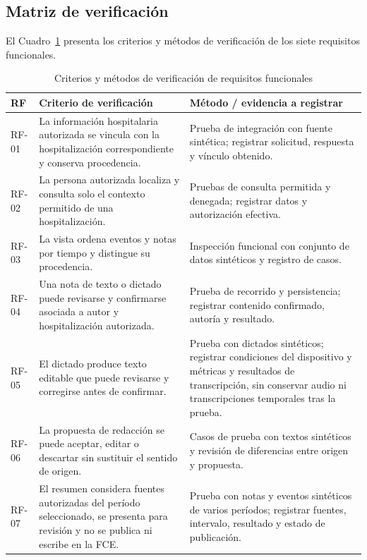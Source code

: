 \subsection{Matriz de verificación}

El Cuadro~\ref{tab:verificacion_rf} presenta los criterios y métodos de verificación de los siete requisitos funcionales.

\begin{table}[H]
    \caption{Criterios y métodos de verificación de requisitos funcionales}
    \label{tab:verificacion_rf}
    \begin{tabularx}{\textwidth}{|l|X|X|}
        \hline
        \textbf{RF} & \textbf{Criterio de verificación} & \textbf{Método / evidencia a registrar} \\
        \hline
        RF-01 & La información hospitalaria autorizada se vincula con la hospitalización correspondiente y conserva procedencia. & Prueba de integración con fuente sintética; registrar solicitud, respuesta y vínculo obtenido. \\
        \hline
        RF-02 & La persona autorizada localiza y consulta solo el contexto permitido de una hospitalización. & Pruebas de consulta permitida y denegada; registrar datos y autorización efectiva. \\
        \hline
        RF-03 & La vista ordena eventos y notas por tiempo y distingue su procedencia. & Inspección funcional con conjunto de datos sintéticos y registro de casos. \\
        \hline
        RF-04 & Una nota de texto o dictado puede revisarse y confirmarse asociada a autor y hospitalización autorizada. & Prueba de recorrido y persistencia; registrar contenido confirmado, autoría y resultado. \\
        \hline
        RF-05 & El dictado produce texto editable que puede revisarse y corregirse antes de confirmar. & Prueba con dictados sintéticos; registrar condiciones del dispositivo y métricas y resultados de transcripción, sin conservar audio ni transcripciones temporales tras la prueba. \\
        \hline
        RF-06 & La propuesta de redacción se puede aceptar, editar o descartar sin sustituir el sentido de origen. & Casos de prueba con textos sintéticos y revisión de diferencias entre origen y propuesta. \\
        \hline
        RF-07 & El resumen considera fuentes autorizadas del período seleccionado, se presenta para revisión y no se publica ni escribe en la FCE. & Prueba con notas y eventos sintéticos de varios períodos; registrar fuentes, intervalo, resultado y estado de publicación. \\
        \hline
    \end{tabularx}
\end{table}

